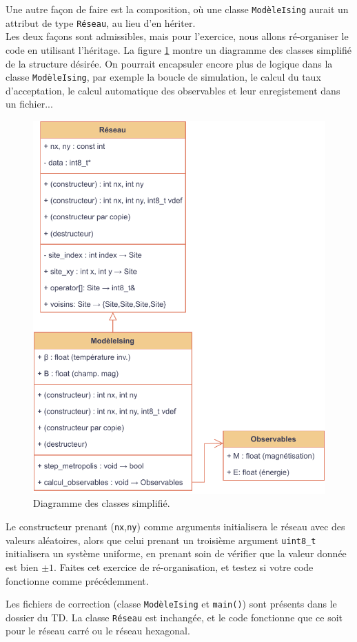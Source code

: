 \documentclass{book}
\newcommand{\inline}[1]{\texttt{#1}}
\begin{document}
Une autre façon de faire est la composition, où une classe \inline{ModèleIsing} aurait un attribut de type \inline{Réseau}, au lieu d'en hériter.\\

Les deux façons sont admissibles, mais pour l'exercice, nous allons ré-organiser le code en utilisant l'héritage. La figure \ref{fig:diag-classes-ising} montre un diagramme des classes simplifié de la structure désirée. On pourrait encapsuler encore plus de logique dans la classe \inline{ModèleIsing}, par exemple la boucle de simulation, le calcul du taux d'acceptation, le calcul automatique des observables et leur enregistement dans un fichier...\\

\begin{figure}[h]
\centering
\includegraphics[width=0.55\linewidth]{TD4/diag-classes-ising.pdf}
\caption{Diagramme des classes simplifié.}
\label{fig:diag-classes-ising}
\end{figure}

Le constructeur prenant (\inline{nx},\inline{ny}) comme arguments initialisera le réseau avec des valeurs aléatoires, alors que celui prenant un troisième argument \inline{uint8_t} initialisera un système uniforme, en prenant soin de vérifier que la valeur donnée est bien $\pm 1$. Faites cet exercice de ré-organisation, et testez si votre code fonctionne comme précédemment.

\begin{correction}
Les fichiers de correction (classe \inline{ModèleIsing} et \inline{main()}) sont présents dans le dossier du TD. La classe \inline{Réseau} est inchangée, et le code fonctionne que ce soit pour le réseau carré ou le réseau hexagonal.
\end{correction}
\end{document}
